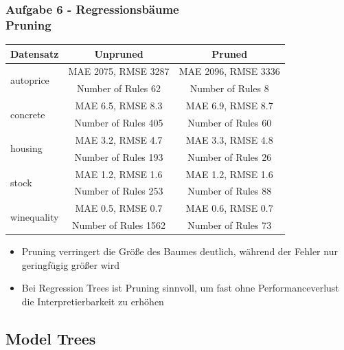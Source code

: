 \documentclass[accentcolor=tud6b,colorbacktitle,inverttitle,landscape,german,presentation,t]{tudbeamer}
\begin{document}
    \begin{frame}[t]
    \frametitle{Aufgabe 6 - Regressionsbäume\\ Pruning}
        \begin{tabular}[htbp]{l||c|c}
            Datensatz & Unpruned & Pruned \\
            \hline
            \hline
            \multirow{2}{*}{autoprice} & MAE 2075, RMSE 3287 & MAE 2096, RMSE 3336 \\
            & Number of Rules 62 & Number of Rules 8 \\
            \hline
            \multirow{2}{*}{concrete} & MAE 6.5, RMSE 8.3 & MAE 6.9, RMSE 8.7 \\
            & Number of Rules 405 & Number of Rules 60 \\
            \hline
            \multirow{2}{*}{housing} & MAE 3.2, RMSE 4.7 & MAE 3.3, RMSE 4.8 \\
            & Number of Rules 193 & Number of Rules 26 \\
            \hline
            \multirow{2}{*}{stock} & MAE 1.2, RMSE 1.6 & MAE 1.2, RMSE 1.6 \\
            & Number of Rules 253 & Number of Rules 88 \\
            \hline
            \multirow{2}{*}{winequality} & MAE 0.5, RMSE 0.7 & MAE 0.6, RMSE 0.7 \\
            & Number of Rules 1562 & Number of Rules 73 \\
        \end{tabular}
        \vfill
\begin{itemize}
       \item Pruning verringert die Größe des Baumes deutlich, während der Fehler nur geringfügig größer wird
        \item Bei Regression Trees ist Pruning sinnvoll, um fast ohne Performanceverlust die Interpretierbarkeit zu erhöhen
\end{itemize}
    \end{frame}
    
    \subsection{Model Trees}
    
\end{document}
